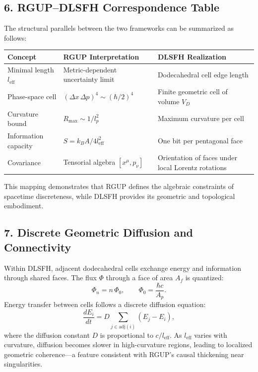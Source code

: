 \documentclass[11pt,oneside]{book}
\numberwithin{equation}{chapter}
\begin{document}
\subsection*{6. RGUP–DLSFH Correspondence Table}

The structural parallels between the two frameworks can be summarized as follows:

\begin{center}
\renewcommand{\arraystretch}{1.15}
\setlength{\tabcolsep}{3pt}
\small %
\begin{tabular}{|p{3.1cm}|p{3.8cm}|p{3.6cm}|}
\hline
\textbf{Concept} & \textbf{RGUP Interpretation} & \textbf{DLSFH Realization} \\ \hline
Minimal length $l_{\text{eff}}$ & Metric-dependent uncertainty limit & Dodecahedral cell edge length \\ \hline
Phase-space cell & $(\Delta x\,\Delta p)^4 \!\sim\! (\hbar/2)^4$ & Finite geometric cell of volume $V_D$ \\ \hline
Curvature bound & $R_{\max}\!\sim\!1/l_p^2$ & Maximum curvature per cell \\ \hline
Information capacity & $S = k_B A / 4l_{\text{eff}}^2$ & One bit per pentagonal face \\ \hline
Covariance & Tensorial algebra $[x^\mu,p_\nu]$ & Orientation of faces under local Lorentz rotations \\ \hline
\end{tabular}
\normalsize
\end{center}



This mapping demonstrates that RGUP defines the algebraic constraints of spacetime discreteness, while DLSFH provides its geometric and topological embodiment.

\subsection*{7. Discrete Geometric Diffusion and Connectivity}

Within DLSFH, adjacent dodecahedral cells exchange energy and information through shared faces.  
The flux $\Phi$ through a face of area $A_f$ is quantized:
\begin{equation}
\Phi_n = n\,\Phi_0, \qquad
\Phi_0 = \frac{\hbar c}{A_p}.
\end{equation}
Energy transfer between cells follows a discrete diffusion equation:
\begin{equation}
\frac{dE_i}{dt} = D
\sum_{j\in \text{adj}(i)}
(E_j - E_i),
\end{equation}
where the diffusion constant $D$ is proportional to $c/l_{\text{eff}}$.  
As $l_{\text{eff}}$ varies with curvature, diffusion becomes slower in high-curvature regions, leading to localized geometric coherence—a feature consistent with RGUP’s causal thickening near singularities.
\end{document}
